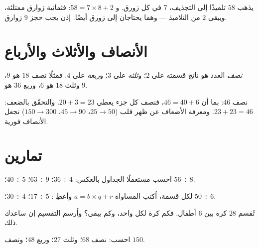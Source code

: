 \begin{example}\label{ex:g3:division:interpret}
يذهب $58$ تلميذًا إلى التجذيف، $7$ في كل زورق.
و $58 = 7 \times 8 + 2$: فثمانية زوارق ممتلئة، ويبقى $2$ من
التلاميذ --- وهما يحتاجان إلى زورق أيضًا. إذن يجب حجز $9$ زوارق.
\end{example}

\section{الأنصاف والأثلاث والأرباع}

\begin{definition}\label{def:g3:division:half}
\emph{نصف} العدد هو ناتج قسمته على $2$؛ و\emph{ثلثه}
على $3$؛ و\emph{ربعه} على $4$. فمثلًا نصف
$18$ هو $9$، وثلث $18$ هو $6$، وربع $36$
هو $9$.
\end{definition}

\begin{example}\label{ex:g3:division:double}
نصف $46$: بما أن $46 = 40 + 6$، فنصف كل جزء يعطي
$20 + 3 = 23$. والتحقّق بالضعف: $23 + 23 = 46$. ومعرفة الأضعاف
عن ظهر قلب ($25 \to 50$، $45 \to 90$، $150 \to 300$) تجعل
الأنصاف فورية.
\end{example}

\section{تمارين}

\begin{exercise}[$\star$]\label{exo:g3:division:1}
احسب مستعملًا الجداول بالعكس: $36 \div 4$؛ \quad $63 \div 9$؛
\quad $40 \div 5$؛ \quad $56 \div 8$.
\end{exercise}

\begin{exercise}[$\star$]\label{exo:g3:division:2}
لكل قسمة، اُكتب المساواة $a = b \times q + r$ وأعطِ
 : $17 \div 5$؛ \quad $30 \div 4$؛ \quad
$50 \div 6$.
\end{exercise}

\begin{exercise}[$\star$]\label{exo:g3:division:3}
تُقسم $28$ كرة بين $6$ أطفال. فكم كرة لكل واحد،
وكم يبقى؟ واُرسم التقسيم إن ساعدك ذلك.
\end{exercise}

\begin{exercise}[$\star$]\label{exo:g3:division:4}
احسب: نصف $68$؛ وثلث $27$؛ وربع $48$؛
ونصف $150$.
\end{exercise}


